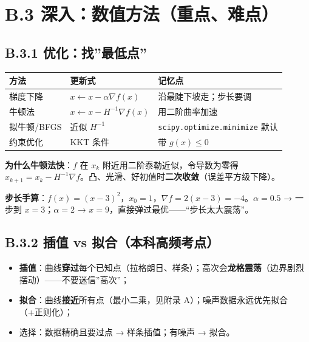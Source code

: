 \section{B.3
深入：数值方法（重点、难点）}\label{b.3-ux6df1ux5165ux6570ux503cux65b9ux6cd5ux91cdux70b9ux96beux70b9}

\subsection{B.3.1
优化：找''最低点''}\label{b.3.1-ux4f18ux5316ux627eux6700ux4f4eux70b9}

{\def\LTcaptype{none} %
\begin{longtable}[]{@{}lll@{}}
\toprule\noalign{}
方法 & 更新式 & 记忆点 \\
\midrule\noalign{}
\endhead
\bottomrule\noalign{}
\endlastfoot
梯度下降 & \(x\gets x-\alpha\nabla f(x)\) & 沿最陡下坡走；步长要调 \\
牛顿法 & \(x\gets x-H^{-1}\nabla f(x)\) & 用二阶曲率加速 \\
拟牛顿/BFGS & 近似 \(H^{-1}\) & \texttt{scipy.optimize.minimize} 默认 \\
约束优化 & KKT 条件 & 带 \(g(x)\le 0\) \\
\end{longtable}
}

\textbf{为什么牛顿法快}：\(f\) 在 \(x_k\)
附近用二阶泰勒近似，令导数为零得
\(x_{k+1}=x_k-H^{-1}\nabla f\)。凸、光滑、好初值时\textbf{二次收敛}（误差平方级下降）。

\textbf{步长手算}：\(f(x)=(x-3)^2\)，\(x_0=1\)，\(\nabla f=2(x-3)=-4\)。\(\alpha=0.5\)
→ 一步到 \(x=3\)；\(\alpha=2\) →
\(x=9\)，直接弹过最优------``步长太大震荡''。

\subsection{B.3.2 插值 vs
拟合（本科高频考点）}\label{b.3.2-ux63d2ux503c-vs-ux62dfux5408ux672cux79d1ux9ad8ux9891ux8003ux70b9}

\begin{itemize}
\tightlist
\item
  \textbf{插值}：曲线\textbf{穿过}每个已知点（拉格朗日、样条）；高次会\textbf{龙格震荡}（边界剧烈摆动）------不要迷信''高次''；
\item
  \textbf{拟合}：曲线\textbf{接近}所有点（最小二乘，见附录
  A）；噪声数据永远优先拟合（+正则化）；
\item
  选择：数据精确且要过点 → 样条插值；有噪声 → 拟合。
\end{itemize}

